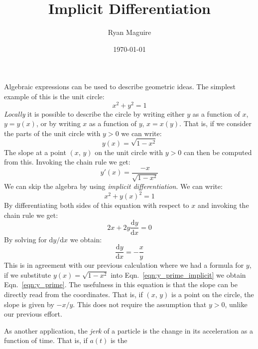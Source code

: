 \documentclass{article}
\title{Implicit Differentiation}
\author{Ryan Maguire}
\date{\today}
\theoremstyle{plain}
\begin{document}
    \maketitle
    Algebraic expressions can be used to describe geometric ideas. The
    simplest example of this is the unit circle:
    \begin{equation}
        x^{2}+y^{2}=1
    \end{equation}
    \textit{Locally} it is possible to describe the circle by writing either
    $y$ as a function of $x$, $y=y(x)$, or by writing $x$ as a function of
    $y$, $x=x(y)$. That is, if we consider the parts of the unit circle with
    $y>0$ we can write:
    \begin{equation}
        y(x)=\sqrt{1-x^{2}}
    \end{equation}
    The slope at a point $(x,\,y)$ on the unit circle with $y>0$ can then be
    computed from this. Invoking the chain rule we get:
    \begin{equation}
        \label{eqn:y_prime}
        y'(x)=\frac{-x}{\sqrt{1-x^{2}}}
    \end{equation}
    We can skip the algebra by using \textit{implicit differentiation}. We can
    write:
    \begin{equation}
        x^{2}+y(x)^{2}=1
    \end{equation}
    By differentiating both sides of this equation with respect to $x$ and
    invoking the chain rule we get:
    \begin{equation}
        2x+2y\frac{\textrm{d}y}{\textrm{d}x}=0
    \end{equation}
    By solving for $\textrm{d}y/\textrm{d}x$ we obtain:
    \begin{equation}
        \label{eqn:y_prime_implicit}
        \frac{\textrm{d}y}{\textrm{d}x}=-\frac{x}{y}
    \end{equation}
    This is in agreement with our previous calculation where we had a formula
    for $y$, if we substitute $y(x)=\sqrt{1-x^{2}}$ into
    Eqn.~\ref{eqn:y_prime_implicit} we obtain
    Eqn.~\ref{eqn:y_prime}. The usefulness in this equation is that the slope
    can be directly read from the coordinates. That is, if $(x,\,y)$ is a point
    on the circle, the slope is given by $-x/y$. This does not require the
    assumption that $y>0$, unlike our previous effort.
    \par\hfill\par
    As another application, the \textit{jerk} of a particle is the change in
    its acceleration as a function of time. That is, if $a(t)$ is the
\end{document}
